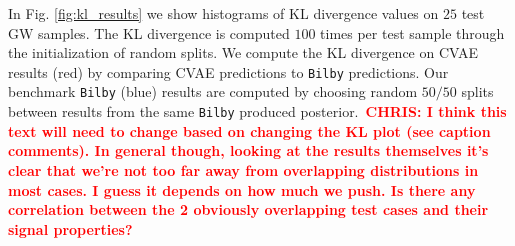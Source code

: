 \documentclass[%
showpacs,
 amsmath,amssymb,
 aps,
 twocolumn,
 prl,
 reprint,
floatfix,
]{revtex4-1}
\newcommand{\chris}[1]{\textbf{\textcolor{red}{CHRIS: #1}}}
\begin{document}
%
In Fig. \ref{fig:kl_results} we show histograms of \ac{KL} divergence values on $25$
test GW samples. The \ac{KL} divergence is computed $100$ times per test sample
through the initialization of random splits. We compute the KL divergence on
\ac{CVAE} results (red) by comparing \ac{CVAE} predictions to \texttt{Bilby}
predictions. Our benchmark \texttt{Bilby} (blue) results are computed by
choosing random $50/50$ splits between results from the same \texttt{Bilby}
produced posterior.~\chris{I think this text will need to change based on
changing the KL plot (see caption comments). In general though, looking at the
results themselves it's clear that we're not too far away from overlapping
distributions in most cases. I guess it depends on how much we push. Is there
any correlation between the 2 obviously overlapping test cases and their signal
properties?}
\end{document}
